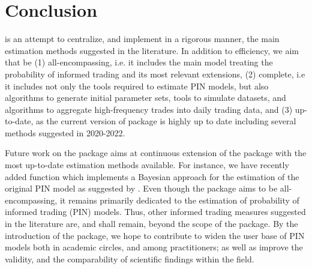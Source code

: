 \section{Conclusion}

 is an attempt to centralize, and implement in a rigorous manner, the main estimation methods suggested in the literature.  In addition to efficiency, we aim that  be (1) all-encompassing, i.e. it includes the main model treating the probability of informed trading and its most relevant extensions, (2) complete, i.e it includes not only the tools required to estimate PIN models, but also algorithms to generate initial parameter sets, tools to simulate datasets, and algorithms to aggregate high-frequency trades into daily trading data, and (3) up-to-date, as the current version of  package is highly up to date including several methods suggested in 2020-2022. 

Future work on the package aims at continuous extension of the package with the most up-to-date estimation methods available. For instance, we have recently added function  which implements a Bayesian approach for the estimation of the original PIN model as suggested by \cite{griffin2021}. Even though the  package aims to be all-encompassing, it remains primarily dedicated to the estimation of probability of informed trading (PIN) models. Thus, other informed trading measures suggested in the literature are, and shall remain, beyond the scope of the package. By the introduction of the package, we hope to contribute to widen the user base of PIN models both in academic circles, and among practitioners; as well as improve the validity, and the comparability of scientific findings within the field.



\address{Montasser Ghachem\\
  Department of Economics, Stockholm University\\
  Stockholm, 106 91, Sweden\\
  Sweden\\
  (0000-0001-6991-3316)\\
  }

\address{Oguz Ersan\\
  International Trade and Finance Department, Kadir Has University\\
  Istanbul, 34083\\
  Turkey\\
  (0000-0003-3135-5317)\\
  }


